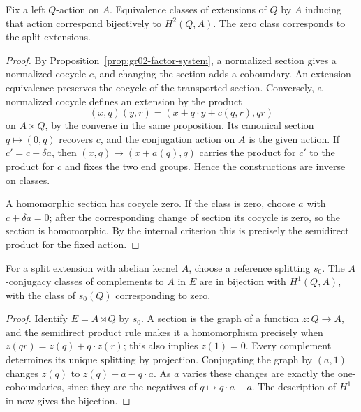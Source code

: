 \begin{theorem}
\label{thm:gr02-h2-extensions}
Fix a left \(Q\)-action on \(A\). Equivalence classes of extensions
of \(Q\) by \(A\) inducing that action correspond bijectively to
\(H^2(Q,A)\). The zero class corresponds to the split extensions.
\end{theorem}

\begin{proof}
By Proposition~\ref{prop:gr02-factor-system}, a normalized
section gives a normalized cocycle \(c\), and changing the section
adds a coboundary. An extension equivalence preserves the cocycle
of the transported section. Conversely, a normalized cocycle
defines an extension by the product
\[
 (x,q)(y,r)=(x+q\cdot y+c(q,r),qr)
\]
on \(A\times Q\), by the converse in the same proposition.
Its canonical section \(q\mapsto(0,q)\) recovers \(c\), and the
conjugation action on \(A\) is the given action. If
\(c'=c+\delta a\), then \((x,q)\mapsto(x+a(q),q)\) carries the
product for \(c'\) to the product for \(c\) and fixes the two
end groups. Hence the constructions are inverse on classes.

A homomorphic section has cocycle zero. If the class is zero,
choose \(a\) with \(c+\delta a=0\); after the corresponding change
of section its cocycle is zero, so the section is homomorphic.
By the internal criterion this is precisely the semidirect product
for the fixed action.
\end{proof}

\begin{theorem}
\label{thm:gr02-h1-complements}
For a split extension with abelian kernel \(A\), choose a reference
splitting \(s_0\). The \(A\)-conjugacy classes of complements to
\(A\) in \(E\) are in bijection with \(H^1(Q,A)\), with the class
of \(s_0(Q)\) corresponding to zero.
\end{theorem}

\begin{proof}
Identify \(E=A\rtimes Q\) by \(s_0\). A section is the graph
of a function \(z:Q\to A\), and the semidirect product rule
makes it a homomorphism precisely when
\(z(qr)=z(q)+q\cdot z(r)\); this also implies \(z(1)=0\).
Every complement determines its unique splitting by projection.
Conjugating the graph by \((a,1)\) changes \(z(q)\) to
\(z(q)+a-q\cdot a\). As \(a\) varies these changes are exactly
the one-coboundaries, since they are the negatives of
\(q\mapsto q\cdot a-a\). The description of \(H^1\) in
\cite[A03]{homalg} now gives the bijection.
\end{proof}

